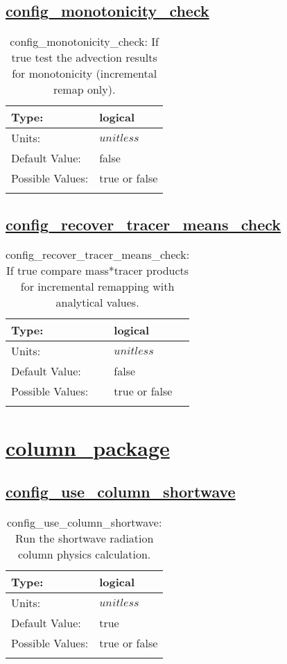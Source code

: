 \subsection[config\_monotonicity\_check]{\hyperref[sec:nm_tab_advection]{config\_monotonicity\_check}}
\label{subsec:nm_sec_config_monotonicity_check}
\begin{center}
\begin{longtable}{| p{2.0in} || p{4.0in} |}
    \hline
    Type: & logical \\
    \hline
    Units: & $unitless$ \\
    \hline
    Default Value: & false \\
    \hline
    Possible Values: & true or false \\
    \hline
    \caption{config\_monotonicity\_check: If true test the advection results for monotonicity (incremental remap only).}
\end{longtable}
\end{center}
\subsection[config\_recover\_tracer\_means\_check]{\hyperref[sec:nm_tab_advection]{config\_recover\_tracer\_means\_check}}
\label{subsec:nm_sec_config_recover_tracer_means_check}
\begin{center}
\begin{longtable}{| p{2.0in} || p{4.0in} |}
    \hline
    Type: & logical \\
    \hline
    Units: & $unitless$ \\
    \hline
    Default Value: & false \\
    \hline
    Possible Values: & true or false \\
    \hline
    \caption{config\_recover\_tracer\_means\_check: If true compare mass*tracer products for incremental remapping with analytical values.}
\end{longtable}
\end{center}
\section[column\_package]{\hyperref[sec:nm_tab_column_package]{column\_package}}
\label{sec:nm_sec_column_package}
\subsection[config\_use\_column\_shortwave]{\hyperref[sec:nm_tab_column_package]{config\_use\_column\_shortwave}}
\label{subsec:nm_sec_config_use_column_shortwave}
\begin{center}
\begin{longtable}{| p{2.0in} || p{4.0in} |}
    \hline
    Type: & logical \\
    \hline
    Units: & $unitless$ \\
    \hline
    Default Value: & true \\
    \hline
    Possible Values: & true or false \\
    \hline
    \caption{config\_use\_column\_shortwave: Run the shortwave radiation column physics calculation.}
\end{longtable}
\end{center}
